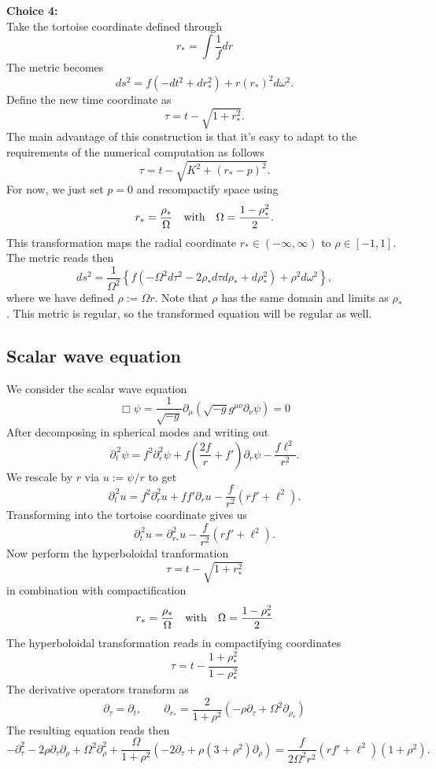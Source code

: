 \documentclass[a4paper]{article}
\begin{document}
{\bf Choice 4:}\\
Take the tortoise coordinate defined through
\[ r_\ast = \int\frac{1}{f}dr \]
The metric becomes 
\[ ds^2 = f \left( -dt^2 + dr_\ast^2\right) + r(r_\ast)^2 d\omega^2. \]
Define the new time coordinate as 
\[ \tau = t - \sqrt{1+r_\ast^2}. \]
The main advantage of this construction is that it's easy to adapt to the requirements of the numerical computation as follows
\[ \tau = t - \sqrt{K^2+(r_\ast-p)^2}. \]
For now, we just set $p=0$ and recompactify space using
\[ r_\ast  = \frac{\rho_\ast}{\Omega} \quad \rm{with} \quad \Omega = \frac{1-\rho_\ast^2}{2}.\]
This transformation maps the radial coordinate $r_\ast\in(-\infty,\infty)$ to $\rho\in[-1,1]$. The metric reads then
\[  ds^2 =  \frac{1}{\Omega^2} \left\{ f\left(-\Omega^2 d\tau^2 - 2 \rho_\ast d\tau d\rho_\ast +  d\rho_\ast^2\right) + \rho^2 d\omega^2 \right\}, \] 
where we have defined $\rho :=  \Omega r$. Note that $\rho$ has the same domain and limits as $\rho_\ast$. This metric is regular, so the transformed equation will be regular as well.

\subsection*{Scalar wave equation}
We consider the scalar wave equation
\[ \Box \psi = \frac{1}{\sqrt{-g}} \partial_\mu \left(\sqrt{-g} g^{\mu\nu} \partial_\nu \psi \right) = 0  \]
After decomposing in spherical modes and writing out
\[ \partial_{{t}}^{\,2}\psi  = f^2 \partial_r^2 \psi + f \left(\frac{2f}{r}+f'\right) \partial_r \psi - \frac{f \ell^2}{r^2}. \]
We rescale by $r$ via $u:=\psi/r$ to get
\[ \partial_{{t}}^{\,2}u  = f^2 \partial_r^2 u + f f' \partial_r u - \frac{f}{r^2} (r f' + \ell^2). \]
Transforming into the tortoise coordinate gives us
\[ \partial_{{t}}^{\,2}u  = \partial_{r_\ast}^2 u  - \frac{f}{r^2} (r f' + \ell^2). \]
Now perform the hyperboloidal tranformation
\[ \tau = t-\sqrt{1+r_\ast^2} \]
in combination with compactification
\[ r_\ast = \frac{\rho_\ast}{\Omega} \quad {\rm with} \quad \Omega=\frac{1-\rho_\ast^2}{2} \]
The hyperboloidal transformation reads in compactifying coordinates
\[ \tau = t - \frac{1+\rho_\ast^2}{1-\rho_\ast^2}\]
The derivative operators transform as
\[ \partial_\tau = \partial_t, \qquad \partial_{r_\ast} = \frac{2}{1+\rho^2} \left(-\rho \partial_\tau + \Omega^2 \partial_{\rho_\ast}\right)  \]
The resulting equation reads then
\[ -\partial_\tau^2 - 2 \rho \partial_\tau \partial_\rho + \Omega^2 \partial_\rho^2 + \frac{\Omega}{1+\rho^2}\left(-2 \partial_\tau + \rho (3+\rho^2) \partial_\rho\right)=
\frac{f}{2\Omega^2 r^2}(r f'+\ell^2)(1+\rho^2). \]
\end{document}
